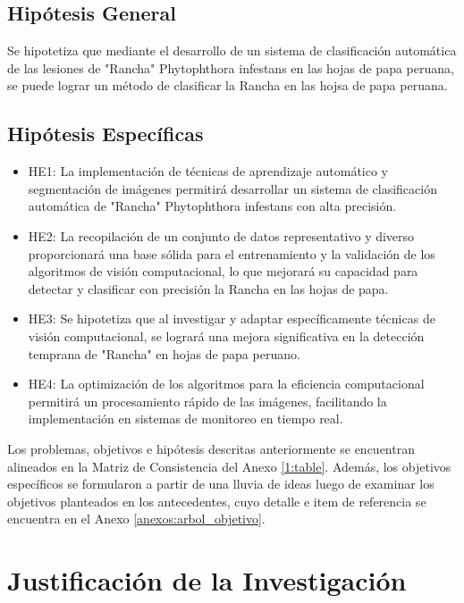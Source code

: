 \subsection{Hipótesis General}
 \newcommand{\HipotesisGeneral}{
	Se hipotetiza que mediante el desarrollo de un sistema de clasificación automática de las lesiones de "Rancha" Phytophthora infestans en las hojas de papa peruana, se puede lograr un método de clasificar la Rancha en las hojsa de papa peruana.
	}
\HipotesisGeneral

\subsection{Hipótesis Específicas}
\newcommand{\Hone}{
	La implementación de técnicas de aprendizaje automático y segmentación de imágenes permitirá desarrollar un sistema de clasificación automática de "Rancha" Phytophthora infestans con alta precisión.
}
\newcommand{\Htwo}{
	La recopilación de un conjunto de datos representativo y diverso proporcionará una base sólida para el entrenamiento y la validación de los algoritmos de visión computacional, lo que mejorará su capacidad para detectar y clasificar con precisión la Rancha en las hojas de papa.
}
\newcommand{\Hthree}{
Se hipotetiza que al investigar y adaptar específicamente técnicas de visión computacional, se logrará una mejora significativa en la detección temprana de "Rancha" en hojas de papa peruano.
}
\newcommand{\Hfour}{
	La optimización de los algoritmos para la eficiencia computacional permitirá un procesamiento rápido de las imágenes, facilitando la implementación en sistemas de monitoreo en tiempo real.
}

\begin{itemize}
	\item HE1: \Hone
	\item HE2: \Htwo
	\item HE3: \Hthree
	\item HE4: \Hfour
\end{itemize}

Los problemas, objetivos e hipótesis descritas anteriormente se encuentran alineados en la Matriz de Consistencia del Anexo \ref{1:table}. Además, los objetivos específicos se formularon a partir de una lluvia de ideas luego de examinar los objetivos planteados en los antecedentes, cuyo detalle e item de referencia se encuentra en el Anexo \ref{anexos:arbol_objetivo}.

\section{Justificación de la Investigación}

